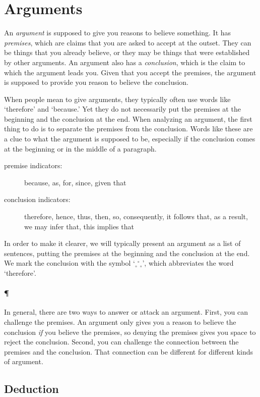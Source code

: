 \documentclass[]{article}
\newcommand*{\newbit}{\paragraph{\P}}
\newcommand*{\therefore}{${_\circ}$\hspace{-2pt}${^\circ}$\hspace{-2pt}${_\circ}$}
\begin{document}
\section{Arguments}


An \emph{argument} is supposed to give you reasons to believe something. It has \emph{premises}, which are claims that you are asked to accept at the outset. They can be things that you already believe, or they may be things that were established by other arguments. An argument also has a \emph{conclusion}, which is the claim to which the argument leads you. Given that you accept the premises, the argument is supposed to provide you reason to believe the conclusion.

When people mean to give arguments, they typically often use words like `therefore' and `because.' Yet they do not necessarily put the premises at the beginning and the conclusion at the end. When analyzing an argument, the first thing to do is to separate the premises from the conclusion. Words like these are a clue to what the argument is supposed to be, especially if the conclusion comes at the beginning or in the middle of a paragraph.

\begin{description}
\item[premise indicators:] because, as, for, since, given that
\item[conclusion indicators:] therefore, hence, thus, then, so, consequently, it follows that, as a result, we may infer that, this implies that
\end{description}

In order to make it clearer, we will typically present an argument as a list of sentences, putting the premises at the beginning and the conclusion at the end. We mark the conclusion with the symbol `\therefore', which abbreviates the word `therefore'.

\newbit
In general, there are two ways to answer or attack an argument. First, you can challenge the premises. An argument only gives you a reason to believe the conclusion \emph{if} you believe the premises, so denying the premises gives you space to reject the conclusion. Second, you can challenge the connection between the premises and the conclusion. That connection can be different for different kinds of argument.


\subsection{Deduction}
\end{document}
